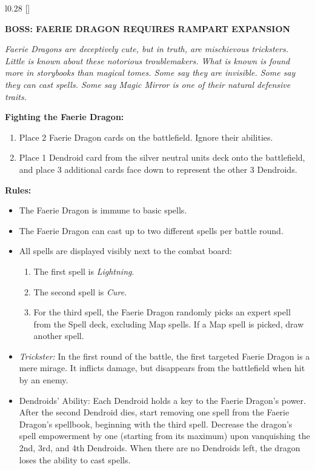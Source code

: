 \begin{wrapfigure}{l}{0.28\textwidth}
  \raisebox{0pt}[\dimexpr{}\baselineskip\relax]{}
\end{wrapfigure}
{
  \textbf{\MakeUppercase{Boss: Faerie Dragon {\scriptsize Requires Rampart Expansion}}}

  \medskip

  \textit{Faerie Dragons are deceptively cute, but in truth, are mischievous tricksters.
    Little is known about these notorious troublemakers.
    What is known is found more in storybooks than magical tomes.
    Some say they are invisible.
    Some say they can cast spells.
    Some say Magic Mirror is one of their natural defensive traits.
  }

  \medskip

  \textbf{Fighting the Faerie Dragon:}
  \begin{enumerate}
    \item Place 2 Faerie Dragon cards on the battlefield.
      Ignore their abilities.
    \item Place 1 Dendroid card from the silver neutral units deck onto the battlefield, and place 3 additional cards face down to represent the other 3 Dendroids.
  \end{enumerate}

  \medskip

  \textbf{Rules:}
  \begin{itemize}
    \item The Faerie Dragon is immune to basic spells.
    \item The Faerie Dragon can cast up to two different spells per battle round.
    \item All spells are displayed visibly next to the combat board:
      \begin{enumerate}[leftmargin=15pt]
        \item The first spell is \textit{Lightning}.
        \item The second spell is \textit{Cure}.
        \item For the third spell, the Faerie Dragon randomly picks an expert spell from the Spell deck, excluding Map spells.
          If a Map spell is picked, draw another spell.
      \end{enumerate}
    \item \textit{Trickster:} In the first round of the battle, the first targeted Faerie Dragon is a mere mirage.
      It inflicts damage, but disappears from the battlefield when hit by an enemy.
    \item Dendroids' Ability: Each Dendroid holds a key to the Faerie Dragon's power.
      After the second Dendroid dies, start removing one spell from the Faerie Dragon's spellbook, beginning with the third spell.
      Decrease the dragon's spell empowerment by one (starting from its maximum) upon vanquishing the 2nd, 3rd, and 4th Dendroids.
      When there are no Dendroids left, the dragon loses the ability to cast spells.
  \end{itemize}
}

